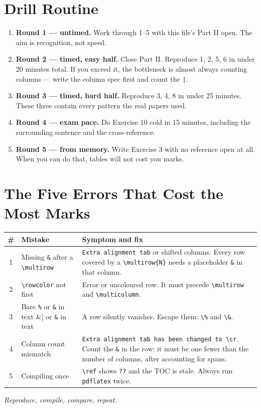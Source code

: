 \documentclass[11pt]{article}
\begin{document}
\section*{Drill Routine}

\begin{enumerate}[leftmargin=*]
\item \textbf{Round 1 --- untimed.} Work through 1--5 with this file's Part II
  open. The aim is recognition, not speed.
\item \textbf{Round 2 --- timed, easy half.} Close Part II. Reproduce 1, 2, 5, 6
  in under 20 minutes total. If you exceed it, the bottleneck is almost always
  counting columns --- write the column spec first and count the \verb!|!.
\item \textbf{Round 3 --- timed, hard half.} Reproduce 3, 4, 8 in under
  25 minutes. These three contain every pattern the real papers used.
\item \textbf{Round 4 --- exam pace.} Do Exercise 10 cold in 15 minutes,
  including the surrounding sentence and the cross-reference.
\item \textbf{Round 5 --- from memory.} Write Exercise 3 with no reference open
  at all. When you can do that, tables will not cost you marks.
\end{enumerate}

\section*{The Five Errors That Cost the Most Marks}

\renewcommand{\arraystretch}{1.4}
\begin{tabularx}{\textwidth}{|c|l|X|}
\hline
\textbf{\#} & \textbf{Mistake} & \textbf{Symptom and fix} \\
\hline
1 & Missing \verb|&| after a \verb|\multirow| &
  \texttt{Extra alignment tab} or shifted columns. Every row covered by a
  \verb|\multirow{N}| needs a placeholder \verb|&| in that column. \\
\hline
2 & \verb|\rowcolor| not first &
  Error or uncoloured row. It must precede \verb|\multirow| and
  \verb|\multicolumn|. \\
\hline
3 & Bare \verb|%| or \verb|&| in text &
  A row silently vanishes. Escape them: \verb|\%| and \verb|\&|. \\
\hline
4 & Column count mismatch &
  \texttt{Extra alignment tab has been changed to \textbackslash cr}. Count the
  \texttt{\&} in the row: it must be one fewer than the number of columns,
  after accounting for spans. \\
\hline
5 & Compiling once &
  \verb|\ref| shows \texttt{??} and the TOC is stale. Always run
  \texttt{pdflatex} twice. \\
\hline
\end{tabularx}

\vfill
\begin{center}\small\itshape
Reproduce, compile, compare, repeat.
\end{center}
\end{document}

